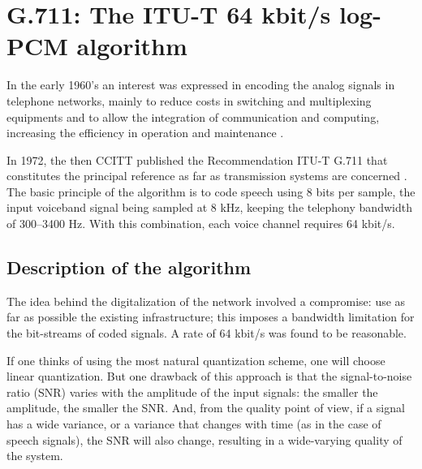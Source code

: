 
%
\chapter{G.711: The ITU-T 64 kbit/s log-PCM algorithm}

In the early 1960's an interest was expressed in encoding the analog signals
in telephone networks, mainly to reduce costs in switching and
multiplexing equipments and to allow the integration of communication
and computing, increasing the efficiency in operation and maintenance
\cite{Qual-meas-tel-sys}.

In 1972, the then CCITT published the Recommendation ITU-T G.711 that
constitutes the principal reference as far as transmission systems
are concerned \cite{G.711}. The basic principle of the algorithm is
to code speech using 8 bits per sample, the input voiceband signal
being sampled at 8 kHz, keeping the telephony bandwidth of
300--3400 Hz. With this combination, each voice channel requires
64 kbit/s.

\section{Description of the algorithm}

The idea behind the digitalization of the network involved a
compromise: use as far as possible the existing infrastructure; this imposes a
bandwidth limitation for the bit-streams of coded signals. A rate of 64
kbit/s was found to be reasonable.

If one thinks of using the most natural quantization scheme, one will
choose linear quantization. But one drawback of this approach is that
the signal-to-noise ratio (SNR) varies with the amplitude of the input
signals: the smaller the amplitude, the smaller the SNR. And, from the
quality point of view, if a signal has a wide variance, or a variance
that changes with time (as in the case of speech signals), the SNR
will also change, resulting in a wide-varying quality of the
system.

